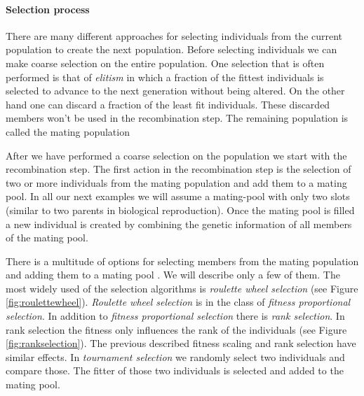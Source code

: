 \paragraph{Selection process}
There are many different approaches for selecting individuals from the current population to create the next population. Before selecting individuals we can make coarse selection on the entire population. One selection that is often performed is that of \textit{elitism} in which a fraction of the fittest individuals is selected to advance to the next generation without being altered. On the other hand one can discard a fraction of the least fit individuals. These discarded members won't be used in the recombination step. The remaining population is called the mating population

After we have performed a coarse selection on the population we start with the recombination step. The first action in the recombination step is the selection of two or more individuals from the mating population and add them to a mating pool. In all our next examples we will assume a mating-pool with only two slots (similar to two parents in biological reproduction). Once the mating pool is filled a new individual is created by combining the genetic information of all members of the mating pool. 

There is a multitude of options for selecting members from the mating population and adding them to a mating pool \citep[for an overview see]{Goldberg91acomparative}. We will describe only a few of them. The most widely used of the selection algorithms is \textit{roulette wheel selection} (see Figure \ref{fig:roulettewheel}). \textit{Roulette wheel selection} is in the class of \textit{fitness proportional selection}. In addition to \textit{fitness proportional selection} there is \textit{rank selection}. In rank selection the fitness only influences the rank of the individuals (see Figure \ref{fig:rankselection}). The previous described fitness scaling and rank selection have similar effects. In \textit{tournament selection} we randomly select two individuals and compare those. The fitter of those two individuals is selected and added to the mating pool. 

